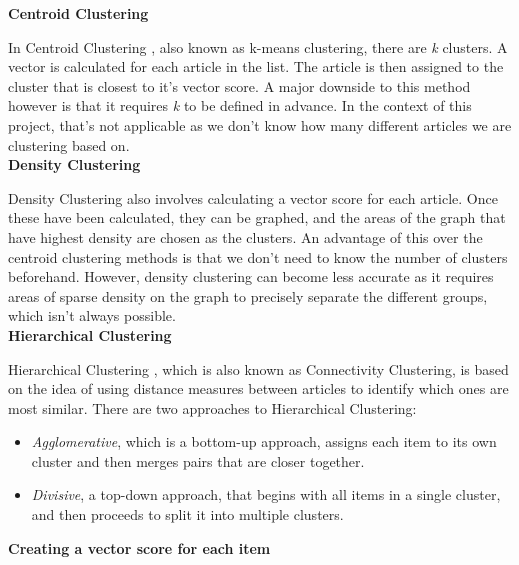 \documentclass[12pt]{article}
\begin{document}
\textbf{Centroid Clustering}

In Centroid Clustering \cite{clusteringWikipedia}, also known as k-means clustering, there are \emph{k} clusters. A vector is calculated for each article in the list. The article is then assigned to the cluster that is closest to it's vector score. A major downside to this method however is that it requires \emph{k} to be defined in advance. In the context of this project, that's not applicable as we don't know how many different articles we are clustering based on. \\

\textbf{Density Clustering}

Density Clustering \cite{clusteringWikipedia} also involves calculating a vector score for each article. Once these have been calculated, they can be graphed, and the areas of the graph that have highest density are chosen as the clusters. An advantage of this over the centroid clustering methods is that we don't need to know the number of clusters beforehand. However, density clustering can become less accurate as it requires areas of sparse density on the graph to precisely separate the different groups, which isn't always possible. \\

\textbf{Hierarchical Clustering}

Hierarchical Clustering \cite{hierarchicalClustering}, which is also known as Connectivity Clustering, is based on the idea of using distance measures between articles to identify which ones are most similar. There are two approaches to Hierarchical Clustering: 
 \begin{itemize}
 	\item \emph{Agglomerative}, which is a bottom-up approach, assigns each item to its own cluster and then merges pairs that are closer together. 
	\item \emph{Divisive}, a top-down approach, that begins with all items in a single cluster, and then proceeds to split it into multiple clusters. \\
\end{itemize}

\textbf{Creating a vector score for each item}
\end{document}
